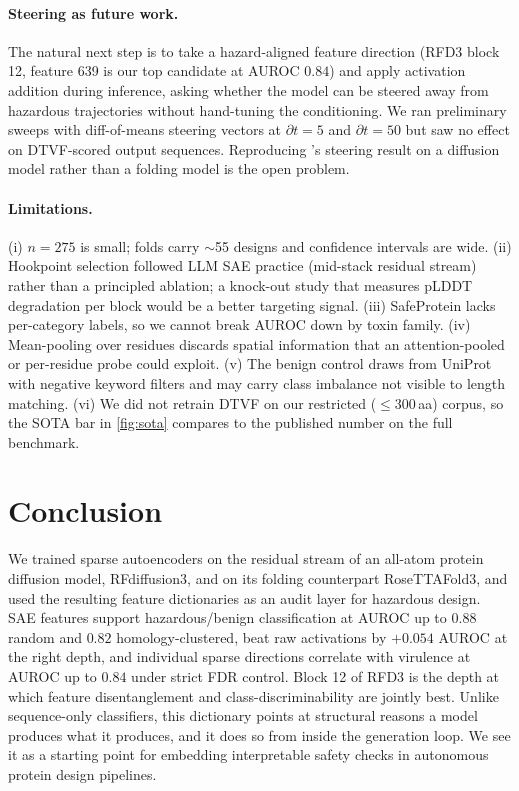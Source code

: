 \documentclass{article}
\theoremstyle{plain}
\theoremstyle{definition}
\theoremstyle{remark}
\begin{document}
\paragraph{Steering as future work.} The natural next step is to take a hazard-aligned feature direction (RFD3 block 12, feature 639 is our top candidate at AUROC $0.84$) and apply activation addition during inference, asking whether the model can be steered away from hazardous trajectories without hand-tuning the conditioning. We ran preliminary sweeps with diff-of-means steering vectors at $\partial t = 5$ and $\partial t = 50$ but saw no effect on DTVF-scored output sequences. Reproducing \citet{parsan2025interpretable}'s steering result on a diffusion model rather than a folding model is the open problem.

\paragraph{Limitations.} (i) $n = 275$ is small; folds carry $\sim$55 designs and confidence intervals are wide. (ii) Hookpoint selection followed LLM SAE practice (mid-stack residual stream) rather than a principled ablation; a knock-out study that measures pLDDT degradation per block would be a better targeting signal. (iii) SafeProtein lacks per-category labels, so we cannot break AUROC down by toxin family. (iv) Mean-pooling over residues discards spatial information that an attention-pooled or per-residue probe could exploit. (v) The benign control draws from UniProt with negative keyword filters and may carry class imbalance not visible to length matching. (vi) We did not retrain DTVF on our restricted ($\leq 300$\,aa) corpus, so the SOTA bar in \cref{fig:sota} compares to the published number on the full benchmark.

\section{Conclusion}

We trained sparse autoencoders on the residual stream of an all-atom protein diffusion model, RFdiffusion3, and on its folding counterpart RoseTTAFold3, and used the resulting feature dictionaries as an audit layer for hazardous design. SAE features support hazardous/benign classification at AUROC up to $0.88$ random and $0.82$ homology-clustered, beat raw activations by $+0.054$ AUROC at the right depth, and individual sparse directions correlate with virulence at AUROC up to $0.84$ under strict FDR control. Block 12 of RFD3 is the depth at which feature disentanglement and class-discriminability are jointly best. Unlike sequence-only classifiers, this dictionary points at structural reasons a model produces what it produces, and it does so from inside the generation loop. We see it as a starting point for embedding interpretable safety checks in autonomous protein design pipelines.
\end{document}
